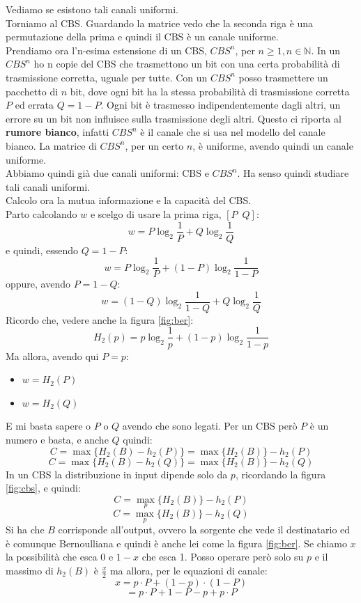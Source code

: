\documentclass[a4paper,12pt, oneside]{book}
\begin{document}
Vediamo se esistono tali canali uniformi.\\
Torniamo al CBS. Guardando la matrice vedo che la seconda riga è una
permutazione della prima e quindi il CBS è un canale uniforme.\\
Prendiamo ora l'n-esima estensione di un CBS, $CBS^n$, per $n\geq 1,
n\in\mathbb{N}$. In un $CBS^n$ ho n copie del CBS che trasmettono un bit con una
certa probabilità di trasmissione corretta, uguale per tutte. Con un $CBS^n$
posso trasmettere un pacchetto di $n$ bit, dove ogni bit ha la stessa
probabilità di trasmissione corretta $P$ ed errata $Q=1-P$. Ogni bit è
trasmesso indipendentemente dagli altri, un errore su un bit non influisce sulla
trasmissione degli altri. Questo ci riporta al \textbf{rumore bianco}, infatti
$CBS^n$ è il canale che si usa nel modello del canale bianco. La matrice di
$CBS^n$, per un certo $n$, è uniforme, avendo quindi un canale uniforme.\\
Abbiamo quindi già due canali uniformi: CBS e $CBS^n$. Ha senso quindi studiare
tali canali uniformi.\\
Calcolo ora la mutua informazione e la capacità del CBS.\\
Parto calcolando $w$ e scelgo di usare la prima riga, $[P\,\,\,Q]$:
\[w=P\log_2\frac{1}{P}+Q\log_2\frac{1}{Q}\]
e quindi, essendo $Q=1-P$:
\[w=P\log_2\frac{1}{P}+(1-P)\log_2\frac{1}{1-P}\]
oppure, avendo $P=1-Q$:
\[w=(1-Q)\log_2\frac{1}{1-Q}+Q\log_2\frac{1}{Q}\]
Ricordo che, vedere anche la figura \ref{fig:ber}:
\[H_2(p)=p\log_2\frac{1}{p}+(1-p)\log_2\frac{1}{1-p}\]
Ma allora, avendo qui $P=p$:
\begin{itemize}
  \item $w=H_2(P)$
  \item $w=H_2(Q)$
\end{itemize}
E mi basta sapere o $P$ o $Q$ avendo che sono legati. Per un CBS però $P$ è un
numero e basta, e anche $Q$ quindi:
\[C=\max \{H_2(B)-h_2(P)\}=\max \{H_2(B)\}-h_2(P)\]
\[C=\max \{H_2(B)-h_2(Q)\}=\max \{H_2(B)\}-h_2(Q)\]
In un CBS la distribuzione in input dipende solo da $p$, ricordando la figura
\ref{fig:cbs}, e quindi: 
\[C=\max_p \{H_2(B)\}-h_2(P)\]
\[C=\max_p \{H_2(B)\}-h_2(Q)\]
Si ha che $B$ corrisponde all'output, ovvero la sorgente che vede il
destinatario ed è comunque Bernoulliana e quindi è anche lei come la figura
\ref{fig:ber}. Se chiamo $x$ la possibilità che esca 0 e $1-x$ che esca 1. Posso
operare però solo su $p$ e il massimo di $h_2(B)$ è $\frac{x}{2}$ ma allora, per
le equazioni di canale:
\[x=p\cdot P+(1-p)\cdot (1-P)\]
\[=p\cdot P+1-P-p+p\cdot P\]
\end{document}
